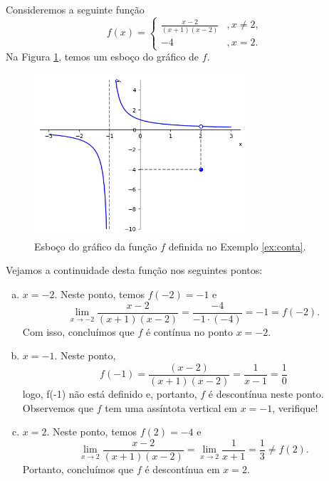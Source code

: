 \begin{ex}\label{ex:conta}
  Consideremos a seguinte função
  \begin{equation}
    f(x) = \left\{
      \begin{array}{ll}
        \frac{x-2}{(x+1)(x-2)} &, x\neq 2,\\
        -4 &, x=2.
      \end{array}
\right.
\end{equation}
Na Figura \ref{fig:ex_conta}, temos um esboço do gráfico de $f$.

\begin{figure}[H]
  \centering
  \includegraphics[width=0.7\textwidth]{./cap_lim/dados/fig_ex_conta/fig_ex_conta}
  \caption{Esboço do gráfico da função $f$ definida no Exemplo \ref{ex:conta}.}
  \label{fig:ex_conta}
\end{figure}

Vejamos a continuidade desta função nos seguintes pontos:
\begin{enumerate}[a)]
\item $x=-2$. Neste ponto, temos $f(-2) = -1$ e
  \begin{equation}
    \lim_{x\to -2} \frac{x-2}{(x+1)(x-2)} = \frac{-4}{-1\cdot(-4)} = -1 = f(-2).
  \end{equation}
  Com isso, concluímos que $f$ é contínua no ponto $x=-2$.
\item $x=-1$. Neste ponto,
  \begin{equation}
    f(-1) = \frac{(x-2)}{(x+1)(x-2)} = \frac{1}{x-1} = \frac{1}{0}
  \end{equation}
  logo, f(-1) não está definido e, portanto, $f$ é descontínua neste ponto. Observemos que $f$ tem uma assíntota vertical em $x=-1$, verifique!
\item $x=2$. Neste ponto, temos $f(2)=-4$ e
  \begin{equation}
    \lim_{x\to 2} \frac{x-2}{(x+1)(x-2)} = \lim_{x\to 2} \frac{1}{x+1} = \frac{1}{3} \neq f(2).
  \end{equation}
  Portanto, concluímos que $f$ é descontínua em $x=2$.
\end{enumerate}
\end{ex}

